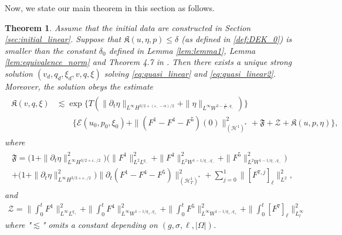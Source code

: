 \documentclass[letterpaper,reqno,10pt,twoside]{amsart}
\newtheorem{theorem}{Theorem}[section]
\theoremstyle{definition}
\theoremstyle{remark}
\def\p{\partial}
\def\Om{\Omega}
\begin{document}
	Now, we state our main theorem in this section as follows.
	\begin{theorem}\label{thm:linear_low}
		Assume that the initial data are constructed in Section \ref{sec:initial_linear}.
		Suppose that $\mathfrak{K}(u,\eta,p)\le\delta$ (as defined in \eqref{def:DEK_0}) is smaller than the constant $\delta_0$ defined in Lemma \ref{lem:lemma1}, Lemma \ref{lem:equivalence_norm} and Theorem 4.7 in \cite{GT2020}.
		Then there exists a unique strong solution $(v_{d},q_{d},\xi_{d}, v, q, \xi)$ solving \eqref{eq:quasi_linear} and \eqref{eq:quasi_linear2}. Moreover, the solution obeys the estimate
		\begin{align}\label{est:bound_linear}
			\begin{aligned}
				\mathfrak{K}(v,q,\xi)&\lesssim\exp\big\{T(\|\p_t\eta\|_{L^\infty H^{3/2+(\varepsilon_--\alpha)/2}}+\|\eta\|_{L^{\infty}W^{3-\frac{1}{q_{-}},q_{-}}})\big\}\\
				&\quad\quad\bigg\{ \mathcal{E}(u_{0},p_{0},\xi_{0}) +\|(F^1-F^4-F^5)(0)\|^{2}_{(\mathcal{H}^1)^\ast}+\mathfrak{F}+\mathcal{Z}+\mathfrak{K}(u,p,\eta)\bigg\},
			\end{aligned}
		\end{align}
		where
		\begin{align}
			\begin{aligned}
				\mathfrak{F}=\big(1+\|\p_t\eta\|_{L^\infty H^{3/2+\varepsilon_-/2}}^2\big)\Big(\|F^1\|_{L^2L^{q_-}}^2+\|F^4\|_{L^2W^{1-1/q_-,q_-}}^2
				+\|F^5\|_{L^2W^{1-1/q_-,q_-}}^2\Big) \\
				+\big(1+\|\p_t\eta\|_{L^\infty H^{3/2+\varepsilon_-/2}}^2\big)\|\p_t(F^1-F^4-F^5)\|_{(\mathcal{H}^1_T)^{\ast}}^2
				+\sum_{j=0}^1\|[F^{7,j}]_\ell\|_{L^2}^2,
			\end{aligned}
		\end{align}
		and
		\begin{align}
			\mathcal{Z}=\|\int_{0}^{t}F^1\|_{L^\infty 
				L^{q_+}}^2 + \|\int_{0}^{t}F^4\|_{L^\infty W^{1-1/q_+,q_+}}^2 + \|\int_{0}^{t}F^5\|_{L^\infty W^{1-1/q_+,q_+}}^2 + \|\int_{0}^{t}[F^7]_\ell\|_{L_t^{\infty}}^2
		\end{align}
		where "$\lesssim$" omits a constant depending on $(g, \sigma, \ell, |\Om|)$.
	\end{theorem}
\end{document}
